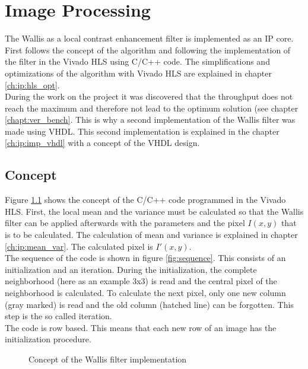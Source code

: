 %
%
\chapter{Image Processing}  \label{chapt:image_processing}
The Wallis as a local contrast enhancement filter is implemented as an IP core. First follows the concept of the algorithm and following the implementation of the filter in the Vivado HLS using C/C++ code. The simplifications and optimizations of the algorithm with Vivado HLS are explained in chapter \ref{ch:ip:hls_opt}. \\
During the work on the project it was discovered that the throughput does not reach the maximum and therefore not lead to the optimum solution (see chapter \ref{chapt:ver_bench}. This is why a second implementation of the Wallis filter was made using VHDL. This second implementation is explained in the chapter \ref{ch:ip:imp_vhdl} with a concept of the VHDL design.

\section{Concept} \label{ch:ip:concept}
Figure \ref{fig:concept} shows the concept of the C/C++ code programmed in the Vivado HLS. First, the local mean and the variance must be calculated so that the Wallis filter can be applied afterwards with the parameters and the pixel $I(x,y)$ that is to be calculated. The calculation of mean and variance is explained in chapter \ref{ch:ip:mean_var}. The calculated pixel is $I'(x,y)$. \\
The sequence of the code is shown in figure \ref{fig:sequence}. This consists of an initialization and an iteration. During the initialization, the complete neighborhood (here as an example 3x3) is read and the central pixel of the neighborhood is calculated. To calculate the next pixel, only one new column (gray marked) is read and the old column (hatched line) can be forgotten. This step is the so called iteration.\\
The code is row based. This means that each new row of an image has the initialization procedure.

\begin{figure}[tb!]
    \centering
    \begin{adjustbox}{max width=\textwidth}
        
    \end{adjustbox}
    \caption{Concept of the Wallis filter implementation}
    \label{fig:concept}
\end{figure}

